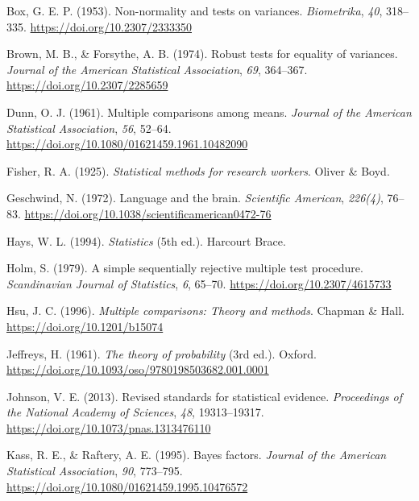 \documentclass[
  a4paper,
]{book}
\newlength{\cslhangindent}
\newlength{\cslentryspacingunit} %
\newenvironment{CSLReferences}[2] %
 {%
  \setlength{\parindent}{0pt}
  \ifodd #1
  \let\oldpar\par
  \def\par{\hangindent=\cslhangindent\oldpar}
  \fi
  \setlength{\parskip}{#2\cslentryspacingunit}
 }%
 {}
\begin{document}
\hypertarget{refs}{}
\begin{CSLReferences}{1}{0}
\leavevmode{}%
Box, G. E. P. (1953). Non-normality and tests on variances.
\emph{Biometrika}, \emph{40}, 318--335.
\url{https://doi.org/10.2307/2333350}

\leavevmode{}%
Brown, M. B., \& Forsythe, A. B. (1974). Robust tests for equality of
variances. \emph{Journal of the American Statistical Association},
\emph{69}, 364--367. \url{https://doi.org/10.2307/2285659}

\leavevmode{}%
Dunn, O. J. (1961). Multiple comparisons among means. \emph{Journal of
the American Statistical Association}, \emph{56}, 52--64.
\url{https://doi.org/10.1080/01621459.1961.10482090}

\leavevmode{}%
Fisher, R. A. (1925). \emph{Statistical methods for research workers}.
Oliver \& Boyd.

\leavevmode{}%
Geschwind, N. (1972). Language and the brain. \emph{Scientific
American}, \emph{226(4)}, 76--83.
\url{https://doi.org/10.1038/scientificamerican0472-76}

\leavevmode{}%
Hays, W. L. (1994). \emph{Statistics} (5th ed.). Harcourt Brace.

\leavevmode{}%
Holm, S. (1979). A simple sequentially rejective multiple test
procedure. \emph{Scandinavian Journal of Statistics}, \emph{6}, 65--70.
\url{https://doi.org/10.2307/4615733}

\leavevmode{}%
Hsu, J. C. (1996). \emph{Multiple comparisons: Theory and methods}.
Chapman \& Hall. \url{https://doi.org/10.1201/b15074}

\leavevmode{}%
Jeffreys, H. (1961). \emph{The theory of probability} (3rd ed.). Oxford.
\url{https://doi.org/10.1093/oso/9780198503682.001.0001}

\leavevmode{}%
Johnson, V. E. (2013). Revised standards for statistical evidence.
\emph{Proceedings of the National Academy of Sciences}, \emph{48},
19313--19317. \url{https://doi.org/10.1073/pnas.1313476110}

\leavevmode{}%
Kass, R. E., \& Raftery, A. E. (1995). Bayes factors. \emph{Journal of
the American Statistical Association}, \emph{90}, 773--795.
\url{https://doi.org/10.1080/01621459.1995.10476572}


\end{CSLReferences}
\end{document}
